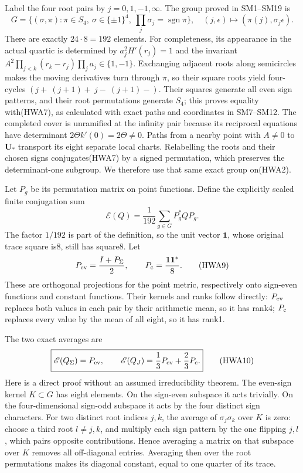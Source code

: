 \documentclass[
  10pt,
  a4paper,
]{article}
\begin{document}
Label the four root pairs by \(j=0,1,-1,\infty\). The group proved in
SM1--SM19 is \[
G=\{(\sigma,\pi):\pi\in S_4,\ \sigma\in\{\pm1\}^4,
\ \prod_j\sigma_j=\operatorname{sgn}\pi\},
\quad(j,\epsilon)\mapsto(\pi(j),\sigma_j\epsilon).
\tag{HWA7}
\] There are exactly \(24\cdot8=192\) elements. For completeness, its
appearance in the actual quartic is determined by \(a_j^2H'(r_j)=1\) and
the invariant \(A^2\prod_{j<k}(r_k-r_j)\prod_ja_j\in\{1,-1\}\).
Exchanging adjacent roots along semicircles makes the moving derivatives
turn through \(\pi\), so their square roots yield four-cycles
\((j+\ (j+1)+\ j-\ (j+1)-)\). Their squares generate all even sign
patterns, and their root permutations generate \(S_4\); this proves
equality with(HWA7), as calculated with exact paths and coordinates in
SM7--SM12. The completed cover is unramified at the infinity pair
because its reciprocal equations have determinant
\(2\Theta k'(0)=2\Theta\ne0\). Paths from a nearby point with \(A\ne0\)
to \(\mathbf U_*\) transport its eight separate local charts.
Relabelling the roots and their chosen signs conjugates(HWA7) by a
signed permutation, which preserves the determinant-one subgroup. We
therefore use that same exact group on(HWA2).

Let \(P_g\) be its permutation matrix on point functions. Define the
explicitly scaled finite conjugation sum \[
\mathscr E(Q)=\frac1{192}\sum_{g\in G}P_g^*QP_g.
\tag{HWA8}
\] The factor \(1/192\) is part of the definition, so the unit vector
\(\mathbf1\), whose original trace square is8, still has square8. Let \[
P_{\rm ev}=\frac{I+P_\Sigma}{2},\qquad
P_{\rm c}=\frac{\mathbf1\mathbf1^*}{8}.
\tag{HWA9}
\] These are orthogonal projections for the point metric, respectively
onto sign-even functions and constant functions. Their kernels and ranks
follow directly: \(P_{\rm ev}\) replaces both values in each pair by
their arithmetic mean, so it has rank4; \(P_{\rm c}\) replaces every
value by the mean of all eight, so it has rank1.

The two exact averages are \[
\boxed{\mathscr E(Q_\Sigma)=P_{\rm ev},\qquad
\mathscr E(Q_J)=\frac13P_{\rm ev}+\frac23P_{\rm c}.}
\tag{HWA10}
\] Here is a direct proof without an assumed irreducibility theorem. The
even-sign kernel \(K\subset G\) has eight elements. On the sign-even
subspace it acts trivially. On the four-dimensional sign-odd subspace it
acts by the four distinct sign characters. For two distinct root indices
\(j,k\), the average of \(\sigma_j\sigma_k\) over \(K\) is zero: choose
a third root \(l\ne j,k\), and multiply each sign pattern by the one
flipping \(j,l\), which pairs opposite contributions. Hence averaging a
matrix on that subspace over \(K\) removes all off-diagonal entries.
Averaging then over the root permutations makes its diagonal constant,
equal to one quarter of its trace.
\end{document}

